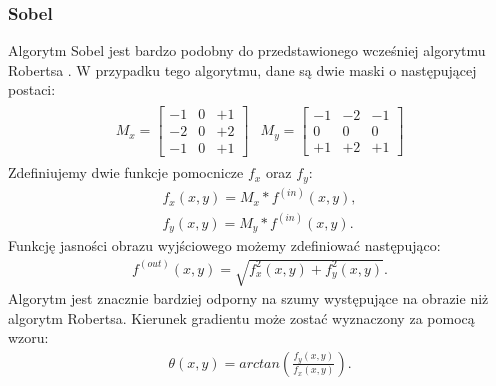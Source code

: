 \subsubsection{Sobel} \label{sssec:sobel}
Algorytm Sobel jest bardzo podobny do przedstawionego wcześniej algorytmu Robertsa \cite{nixon08}. W przypadku tego algorytmu, dane są dwie maski o następującej postaci:
\begin{gather*}
\begin{matrix}
  M_x = \begin{bmatrix}
    -1 & 0 & +1 \\
    -2 & 0 & +2 \\
    -1 & 0 & +1
  \end{bmatrix}
&
  M_y = \begin{bmatrix}
    -1 & -2 & -1 \\
    0 & 0 & 0 \\
    +1 & +2 & +1
  \end{bmatrix}
\end{matrix}
\end{gather*}
Zdefiniujemy dwie funkcje pomocnicze $f_x$ oraz $f_y$:
\begin{gather*}
  f_x(x, y)  = M_x * f^{(in)}(x, y), \\
  f_y(x, y)  = M_y * f^{(in)}(x, y).
\end{gather*}
Funkcję jasności obrazu wyjściowego możemy zdefiniować następująco:
\begin{gather*}
  f^{(out)}(x, y) = \sqrt{f_x^2(x, y)+f_{y}^2(x, y)}.
\end{gather*}
Algorytm jest znacznie bardziej odporny na szumy występujące na obrazie niż algorytm Robertsa. Kierunek gradientu może zostać wyznaczony za pomocą wzoru:
\begin{gather*}
  \theta(x, y) = arctan(\frac{f_y(x, y)}{f_x(x, y)}).
\end{gather*}
